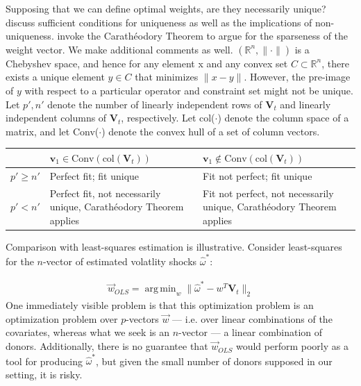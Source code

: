 \documentclass[11pt]{article}
\newcommand{\V}{\textbf{V}}
\DeclareMathOperator*{\argmin}{arg\,min} %
\theoremstyle{definition}
\begin{document}
Supposing that we can define optimal weights, are they necessarily unique?  \cite{lin2021minimizing} discuss sufficient conditions for uniqueness as well as the implications of non-uniqueness.  \cite{abadie2022synthetic} invoke the Carath\'eodory Theorem to argue for the sparseness of the weight vector.  We make additional comments as well. $(\mathbb{R}^{n}, \|\cdot\|)$ is a Chebyshev space, and hence for any element x and any convex set $C\subset \mathbb{R}^{n}$, there exists a unique element $y\in C$ that minimizes $\|x-y\|$.  However, the pre-image of $y$ with respect to a particular operator and constraint set might not be unique.  Let $p', n'$ denote the number of linearly independent rows of $\V_{t}$ and linearly independent columns of $\V_{t}$, respectively.  Let col($\cdot$) denote the column space of a matrix, and let Conv($\cdot$) denote the convex hull of a set of column vectors.  \\

    \begin{center}
      \begin{tabular}{ | m{3em} | m{7cm}| m{7cm} | } 
        \hline
        & $\textbf{v}_{1}\in \text{Conv}(\text{col}(\V_{t}))$ & $\textbf{v}_{1} \notin \text{Conv}(\text{col}(\V_{t}))$\\ 
        \hline
        $p' \geq n'$ & Perfect fit; fit unique & Fit not perfect; fit unique \\
        \hline
        $p' < n'$ & Perfect fit, not necessarily unique, Carath\'eodory Theorem applies& Fit not perfect, not necessarily unique, Carath\'eodory Theorem applies \\ 
        \hline
      \end{tabular}
      \end{center} 

Comparison with least-squares estimation is illustrative.  Consider least-squares for the $n$-vector of estimated volatlity shocks $\hat\omega^{*}$:

\begin{align*}
\vec{w}_{OLS}=\argmin_{{w}} \|\hat{\omega}^{*} - w^{T}\textbf{V}_{t}\|_{2}
\end{align*} 
One immediately visible problem is that this optimization problem is an optimization problem over $p$-vectors $\vec{w}$ --- i.e. over linear combinations of the covariates, whereas what we seek is an $n$-vector --- a linear combination of donors.  Additionally, there is no guarantee that $\vec{w}_{OLS}$ would perform poorly as a tool for producing $\hat\omega^{*}$, but given the small number of donors supposed in our setting, it is risky.
\end{document}
